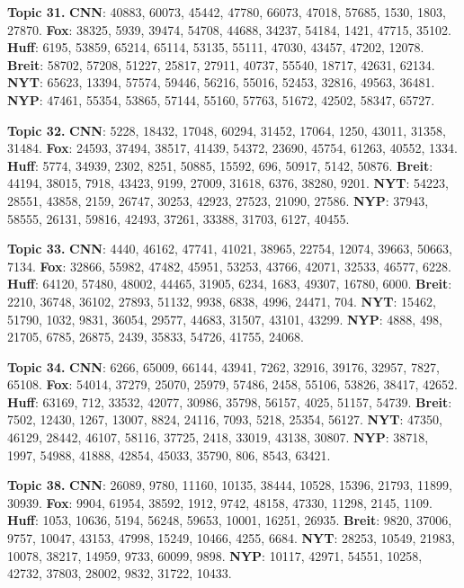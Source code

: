 \documentclass[11pt]{article}
\begin{document}
\textbf{Topic 31.}
\textbf{CNN}: 40883, 60073, 45442, 47780, 66073, 47018, 57685, 1530, 1803, 27870.
\textbf{Fox}: 38325, 5939, 39474, 54708, 44688, 34237, 54184, 1421, 47715, 35102.
\textbf{Huff}: 6195, 53859, 65214, 65114, 53135, 55111, 47030, 43457, 47202, 12078.
\textbf{Breit}: 58702, 57208, 51227, 25817, 27911, 40737, 55540, 18717, 42631, 62134.
\textbf{NYT}: 65623, 13394, 57574, 59446, 56216, 55016, 52453, 32816, 49563, 36481.
\textbf{NYP}: 47461, 55354, 53865, 57144, 55160, 57763, 51672, 42502, 58347, 65727.


\textbf{Topic 32.}
\textbf{CNN}: 5228, 18432, 17048, 60294, 31452, 17064, 1250, 43011, 31358, 31484.
\textbf{Fox}: 24593, 37494, 38517, 41439, 54372, 23690, 45754, 61263, 40552, 1334.
\textbf{Huff}: 5774, 34939, 2302, 8251, 50885, 15592, 696, 50917, 5142, 50876.
\textbf{Breit}: 44194, 38015, 7918, 43423, 9199, 27009, 31618, 6376, 38280, 9201.
\textbf{NYT}: 54223, 28551, 43858, 2159, 26747, 30253, 42923, 27523, 21090, 27586.
\textbf{NYP}: 37943, 58555, 26131, 59816, 42493, 37261, 33388, 31703, 6127, 40455.


\textbf{Topic 33.}
\textbf{CNN}: 4440, 46162, 47741, 41021, 38965, 22754, 12074, 39663, 50663, 7134.
\textbf{Fox}: 32866, 55982, 47482, 45951, 53253, 43766, 42071, 32533, 46577, 6228.
\textbf{Huff}: 64120, 57480, 48002, 44465, 31905, 6234, 1683, 49307, 16780, 6000.
\textbf{Breit}: 2210, 36748, 36102, 27893, 51132, 9938, 6838, 4996, 24471, 704.
\textbf{NYT}: 15462, 51790, 1032, 9831, 36054, 29577, 44683, 31507, 43101, 43299.
\textbf{NYP}: 4888, 498, 21705, 6785, 26875, 2439, 35833, 54726, 41755, 24068.


\textbf{Topic 34.}
\textbf{CNN}: 6266, 65009, 66144, 43941, 7262, 32916, 39176, 32957, 7827, 65108.
\textbf{Fox}: 54014, 37279, 25070, 25979, 57486, 2458, 55106, 53826, 38417, 42652.
\textbf{Huff}: 63169, 712, 33532, 42077, 30986, 35798, 56157, 4025, 51157, 54739.
\textbf{Breit}: 7502, 12430, 1267, 13007, 8824, 24116, 7093, 5218, 25354, 56127.
\textbf{NYT}: 47350, 46129, 28442, 46107, 58116, 37725, 2418, 33019, 43138, 30807.
\textbf{NYP}: 38718, 1997, 54988, 41888, 42854, 45033, 35790, 806, 8543, 63421.



\textbf{Topic 38.}
\textbf{CNN}: 26089, 9780, 11160, 10135, 38444, 10528, 15396, 21793, 11899, 30939.
\textbf{Fox}: 9904, 61954, 38592, 1912, 9742, 48158, 47330, 11298, 2145, 1109.
\textbf{Huff}: 1053, 10636, 5194, 56248, 59653, 10001, 16251, 26935.
\textbf{Breit}: 9820, 37006, 9757, 10047, 43153, 47998, 15249, 10466, 4255, 6684.
\textbf{NYT}: 28253, 10549, 21983, 10078, 38217, 14959, 9733, 60099, 9898.
\textbf{NYP}: 10117, 42971, 54551, 10258, 42732, 37803, 28002, 9832, 31722, 10433.
\end{document}
